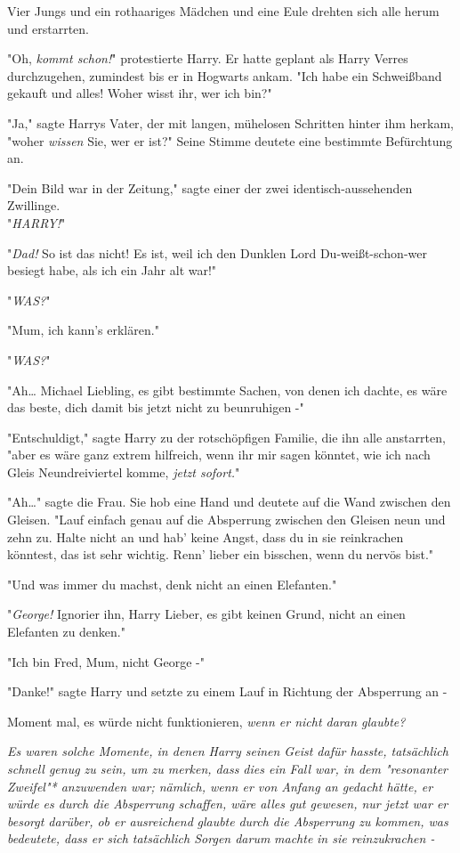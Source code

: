 {Vier Jungs und ein rothaariges Mädchen und eine Eule drehten sich alle herum und erstarrten.

"Oh, \emph{kommt schon!}" protestierte Harry. Er hatte geplant als Harry Verres durchzugehen, zumindest bis er in Hogwarts ankam. "Ich habe ein Schweißband gekauft und alles! Woher wisst ihr, wer ich bin?"

"Ja," sagte Harrys Vater, der mit langen, mühelosen Schritten hinter ihm herkam, "woher \emph{wissen} Sie, wer er ist?" Seine Stimme deutete eine bestimmte Befürchtung an.

"Dein Bild war in der Zeitung," sagte einer der zwei identisch-aussehenden Zwillinge.\\ "\emph{HARRY!}"

"\emph{Dad!} So ist das nicht! Es ist, weil ich den Dunklen Lord Du-weißt-schon-wer besiegt habe, als ich ein Jahr alt war!"

"\emph{WAS?}"

"Mum, ich kann's erklären."

"\emph{WAS?}"

"Ah… Michael Liebling, es gibt bestimmte Sachen, von denen ich dachte, es wäre das beste, dich damit bis jetzt nicht zu beunruhigen -"

"Entschuldigt," sagte Harry zu der rotschöpfigen Familie, die ihn alle anstarrten, "aber es wäre ganz extrem hilfreich, wenn ihr mir sagen könntet, wie ich nach Gleis Neundreiviertel komme, \emph{jetzt sofort.}"

"Ah…" sagte die Frau. Sie hob eine Hand und deutete auf die Wand zwischen den Gleisen. "Lauf einfach genau auf die Absperrung zwischen den Gleisen neun und zehn zu. Halte nicht an und hab' keine Angst, dass du in sie reinkrachen könntest, das ist sehr wichtig. Renn' lieber ein bisschen, wenn du nervös bist."

"Und was immer du machst, denk nicht an einen Elefanten."

"\emph{George!} Ignorier ihn, Harry Lieber, es gibt keinen Grund, nicht an einen Elefanten zu denken."

"Ich bin Fred, Mum, nicht George -"

"Danke!" sagte Harry und setzte zu einem Lauf in Richtung der Absperrung an -

Moment mal, es würde nicht funktionieren, \emph{wenn er nicht daran glaubte?}

\emph{Es waren solche Momente, in denen Harry seinen Geist dafür hasste, tatsächlich schnell genug zu sein, um zu merken, dass dies ein Fall war, in dem "resonanter Zweifel"* anzuwenden war; nämlich, wenn er von Anfang an gedacht hätte, er würde es durch die Absperrung schaffen, wäre alles gut gewesen, nur jetzt war er besorgt darüber, ob er ausreichend} \emph{\emph{glaubte}} \emph{durch die Absperrung zu kommen, was bedeutete, dass er sich tatsächlich Sorgen darum} \emph{\emph{machte}} \emph{in sie reinzukrachen -}

}

